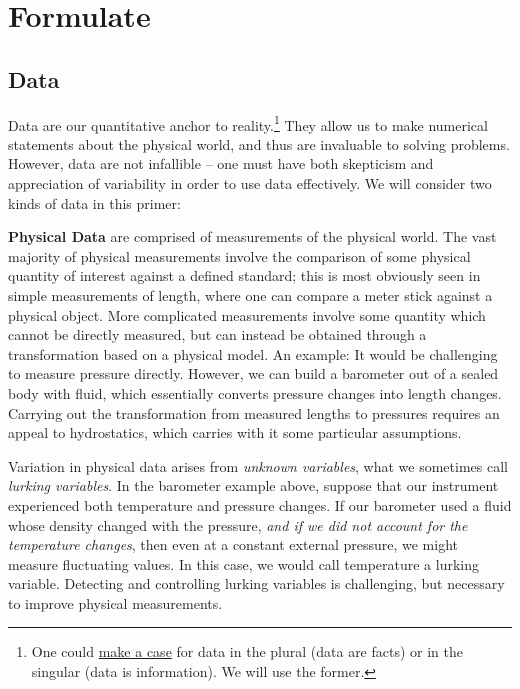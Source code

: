 \documentclass[../primer.tex]{subfiles}
\begin{document}
\chapter{Formulate}

\section{Data}
Data are our quantitative anchor to reality.\footnote{One could
  \href{http://phdcomics.com/comics.php?f=1816}{make a case} for data in the
  plural (data are facts) or in the singular (data is information). We will use
  the former.} They allow us to make numerical statements about the physical
world, and thus are invaluable to solving problems. However, data are not
infallible -- one must have both skepticism and appreciation of variability in
order to use data effectively. We will consider two kinds of data in this
primer:

\textbf{Physical Data} are comprised of measurements of the physical world. The
vast majority of physical measurements involve the comparison of some physical
quantity of interest against a defined standard; this is most obviously seen in
simple measurements of length, where one can compare a meter stick against a
physical object. More complicated measurements involve some quantity which
cannot be directly measured, but can instead be obtained through a
transformation based on a physical model. An example: It would be challenging to
measure pressure directly. However, we can build a barometer out of a sealed
body with fluid, which essentially converts pressure changes into length
changes. Carrying out the transformation from measured lengths to pressures
requires an appeal to hydrostatics, which carries with it some particular
assumptions.

Variation in physical data arises from \emph{unknown variables}, what we
sometimes call \emph{lurking variables}.\cite{box1966} In the barometer example
above, suppose that our instrument experienced both temperature and pressure
changes. If our barometer used a fluid whose density changed with the pressure,
\emph{and if we did not account for the temperature changes}, then even at a
constant external pressure, we might measure fluctuating values. In this case,
we would call temperature a lurking variable. Detecting and controlling lurking
variables is challenging, but necessary to improve physical
measurements.\cite{joiner1981,delRosario2017lurking}
\end{document}
